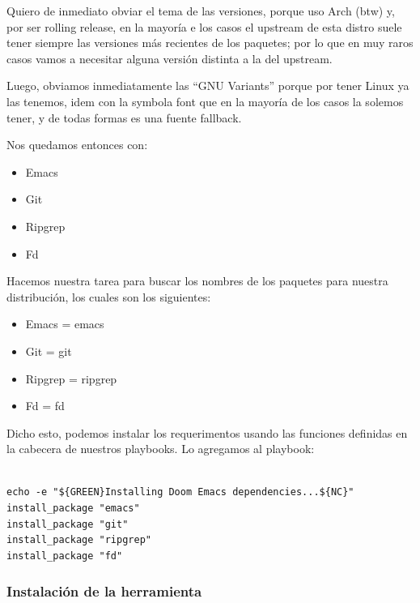 \documentclass[11pt]{article}
\begin{document}
Quiero de inmediato obviar el tema de las versiones, porque uso Arch (btw) y, por ser rolling release, en la mayoría e los casos el upstream de esta distro suele tener siempre las versiones más recientes de los paquetes; por lo que en muy raros casos vamos a necesitar alguna versión distinta a la del upstream.

Luego, obviamos inmediatamente las ``GNU Variants'' porque por tener Linux ya las tenemos, idem con la symbola font que en la mayoría de los casos la solemos tener, y de todas formas es una fuente fallback.

Nos quedamos entonces con:
\begin{itemize}
\item Emacs
\item Git
\item Ripgrep
\item Fd
\end{itemize}

Hacemos nuestra tarea para buscar los nombres de los paquetes para nuestra distribución, los cuales son los siguientes:

\begin{itemize}
\item Emacs = emacs
\item Git = git
\item Ripgrep = ripgrep
\item Fd = fd
\end{itemize}

Dicho esto, podemos instalar los requerimentos usando las funciones definidas en la cabecera de nuestros playbooks. Lo agregamos al playbook:

\begin{verbatim}

echo -e "${GREEN}Installing Doom Emacs dependencies...${NC}"
install_package "emacs"
install_package "git"
install_package "ripgrep"
install_package "fd"

\end{verbatim}
\subsubsection{Instalación de la herramienta}
\label{sec:org35b88d9}
\end{document}
